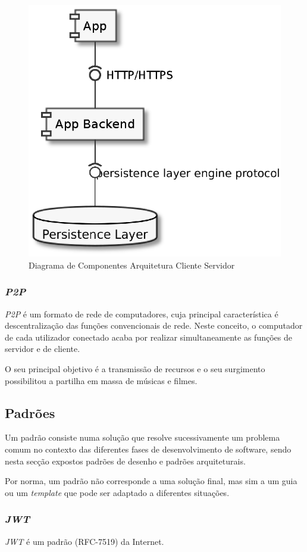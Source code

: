 \begin{figure}[H]
    \begin{center}
    \includegraphics[width=0.5 \textwidth]{figures/actual_web.eps}
    \caption{Diagrama de Componentes Arquitetura Cliente Servidor}
    \end{center}
\end{figure}

\subsubsection{\emph{\acrshort{P2P}} \label{subsection:p2p}}
\emph{\acrshort{P2P}} é um formato de rede de computadores, cuja principal característica é descentralização das funções convencionais de rede. Neste conceito, o computador de cada utilizador conectado acaba por realizar simultaneamente as funções de servidor e de cliente\cite{what_are_P2P_networks}.

O seu principal objetivo é a transmissão de recursos e o seu surgimento possibilitou a partilha em massa de músicas e filmes\cite{what_are_P2P_networks}.

\subsection{Padrões}
Um padrão consiste numa solução que resolve sucessivamente um problema comum no contexto das diferentes fases de desenvolvimento de software, sendo nesta secção expostos padrões de desenho e padrões arquiteturais. 

Por norma, um padrão não corresponde a uma solução final, mas sim a um guia ou um \emph{template} que pode ser adaptado a diferentes situações\cite{clean_architecture}.

\subsubsection{\emph{\acrfull{JWT}}\label{subsection:jwt}}
\emph{\acrshort{JWT}} é um padrão (RFC-7519) da Internet.

